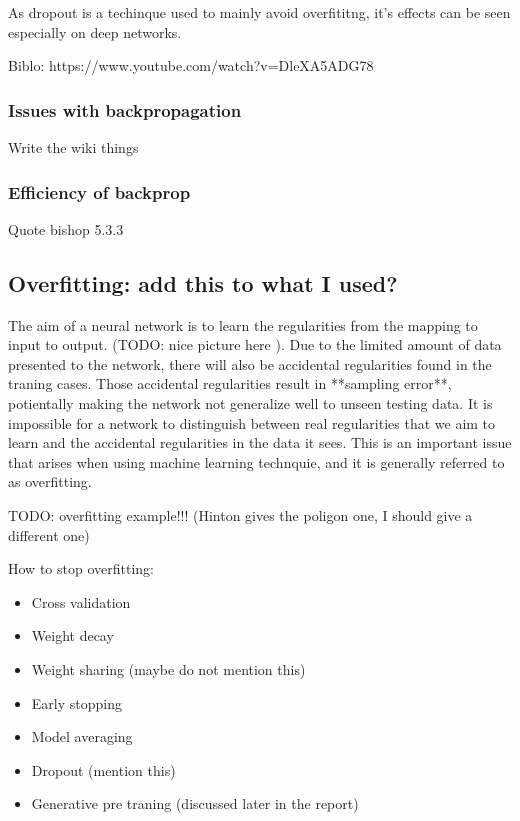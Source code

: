 \documentclass[11pt, fleqn, twoside]{article}
\begin{document}
  As dropout is a techinque used to mainly avoid overfititng, it's effects can be seen especially on deep networks.

  Biblo: https://www.youtube.com/watch?v=DleXA5ADG78


\subsubsection{ Issues with backpropagation}
  Write the wiki things

\subsubsection{ Efficiency of backprop}
  Quote bishop 5.3.3

\subsection{Overfitting: add this to what I used?}

  The aim of a neural network is to learn the regularities from the mapping to input to output. (TODO: nice picture here ). Due to the limited amount of data presented to the network, there will also be accidental regularities found in the traning cases. Those accidental regularities result in **sampling error**, potientally making the network not generalize well to unseen testing data. It is impossible for a network to distinguish between real regularities that we aim to learn and the accidental regularities in the data it sees. This is an important issue that arises when using machine learning technquie, and it is generally referred to as overfitting.

  TODO: overfitting example!!! (Hinton gives the poligon one, I should give a different one)

  How to stop overfitting:

\begin{itemize}
  \item Cross validation
  \item Weight decay
  \item Weight sharing (maybe do not mention this)
  \item Early stopping
  \item Model averaging
  \item Dropout (mention this)
  \item Generative pre traning (discussed later in the report)
\end{itemize}
\end{document}
